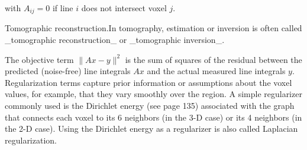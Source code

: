 with \(A_{ij}=0\) if line \(i\) does not intersect voxel \(j\).

Tomographic reconstruction.In tomography, estimation or inversion is often called _tomographic reconstruction_ or _tomographic inversion_.

The objective term \(\|Ax-y\|^{2}\) is the sum of squares of the residual between the predicted (noise-free) line integrals \(Ax\) and the actual measured line integrals \(y\). Regularization terms capture prior information or assumptions about the voxel values, for example, that they vary smoothly over the region. A simple regularizer commonly used is the Dirichlet energy (see page 135) associated with the graph that connects each voxel to its 6 neighbors (in the 3-D case) or its 4 neighbors (in the 2-D case). Using the Dirichlet energy as a regularizer is also called Laplacian regularization.

 